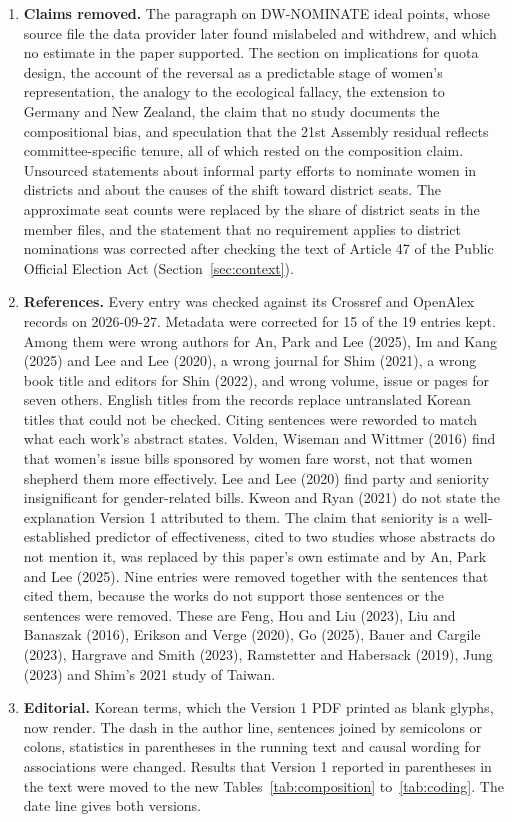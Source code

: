 \documentclass[11pt]{article}
\begin{document}
{\begin{enumerate}
\item \textbf{Claims removed.} The paragraph on DW-NOMINATE ideal points, whose source file the data provider later found mislabeled and withdrew, and which no estimate in the paper supported. The section on implications for quota design, the account of the reversal as a predictable stage of women's representation, the analogy to the ecological fallacy, the extension to Germany and New Zealand, the claim that no study documents the compositional bias, and speculation that the 21st Assembly residual reflects committee-specific tenure, all of which rested on the composition claim. Unsourced statements about informal party efforts to nominate women in districts and about the causes of the shift toward district seats. The approximate seat counts were replaced by the share of district seats in the member files, and the statement that no requirement applies to district nominations was corrected after checking the text of Article 47 of the Public Official Election Act (Section~\ref{sec:context}).
\item \textbf{References.} Every entry was checked against its Crossref and OpenAlex records on 2026-09-27. Metadata were corrected for 15 of the 19 entries kept. Among them were wrong authors for An, Park and Lee (2025), Im and Kang (2025) and Lee and Lee (2020), a wrong journal for Shim (2021), a wrong book title and editors for Shin (2022), and wrong volume, issue or pages for seven others. English titles from the records replace untranslated Korean titles that could not be checked. Citing sentences were reworded to match what each work's abstract states. Volden, Wiseman and Wittmer (2016) find that women's issue bills sponsored by women fare worst, not that women shepherd them more effectively. Lee and Lee (2020) find party and seniority insignificant for gender-related bills. Kweon and Ryan (2021) do not state the explanation Version 1 attributed to them. The claim that seniority is a well-established predictor of effectiveness, cited to two studies whose abstracts do not mention it, was replaced by this paper's own estimate and by An, Park and Lee (2025). Nine entries were removed together with the sentences that cited them, because the works do not support those sentences or the sentences were removed. These are Feng, Hou and Liu (2023), Liu and Banaszak (2016), Erikson and Verge (2020), Go (2025), Bauer and Cargile (2023), Hargrave and Smith (2023), Ramstetter and Habersack (2019), Jung (2023) and Shim's 2021 study of Taiwan.
\item \textbf{Editorial.} Korean terms, which the Version 1 PDF printed as blank glyphs, now render. The dash in the author line, sentences joined by semicolons or colons, statistics in parentheses in the running text and causal wording for associations were changed. Results that Version 1 reported in parentheses in the text were moved to the new Tables~\ref{tab:composition} to~\ref{tab:coding}. The date line gives both versions.
\end{enumerate}
}
\end{document}
